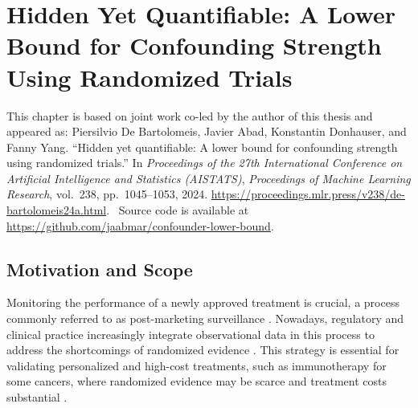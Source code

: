 \chapter{Hidden Yet Quantifiable: A Lower Bound for Confounding Strength Using Randomized Trials}
\label{chap:confounding-test}


\chapterpublication
  {This chapter is based on joint work co-led by the author of this thesis and appeared as:}
  {Piersilvio De Bartolomeis\equalcontributionmark, Javier Abad\equalcontributionmark, Konstantin Donhauser, and Fanny Yang. ``Hidden yet quantifiable: A lower bound for confounding strength using randomized trials.'' In \emph{Proceedings of the 27th International Conference on Artificial Intelligence and Statistics (AISTATS)}, \emph{Proceedings of Machine Learning Research}, vol.~238, pp.~1045--1053, 2024. \url{https://proceedings.mlr.press/v238/de-bartolomeis24a.html}. \equalcontributionnote\ Source code is available at \url{https://github.com/jaabmar/confounder-lower-bound}.}

\vspace{-0.6\baselineskip}

\section{Motivation and Scope}

Monitoring the performance of a newly approved treatment is crucial, a process commonly referred to as post-marketing surveillance \citep{vlahovic2011postmarketing}. Nowadays, regulatory and clinical practice increasingly integrate observational data in this process to address the shortcomings of randomized evidence \citep{platt2018fda,klonoff2020new}. This strategy is essential for validating personalized and high-cost treatments, such as immunotherapy for some cancers, where randomized evidence may be scarce and treatment costs substantial \citep{goetz2018personalized}.

